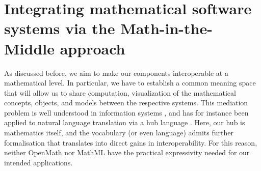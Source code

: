 \section{Integrating mathematical software systems via the Math-in-the-Middle approach}\label{sec:mitm}


As discussed before, we aim to make our components interoperable at a mathematical level.
In particular, we have to establish a common meaning space that will 
allow us to share computation, visualization of the mathematical concepts, objects, and models
between the respective systems. This mediation problem is well understood in information systems
\cite{mediator}, and has for instance been applied to natural language translation via a hub
language \cite{kanayama}.
Here, our hub is mathematics itself, and the vocabulary (or even language) admits further
formalisation that translates into direct gains in interoperability. For this reason, neither
OpenMath \cite{openmath} nor MathML \cite{mathml} have the practical expressivity needed for
our intended applications. 




